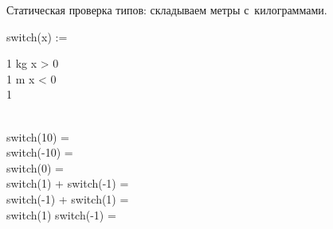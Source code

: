 


    Статическая проверка типов: складываем метры с~килограммами.

    \begin{preproc}

        switch(x) := \begin{caseblock}
                         1 \cdot kg \when x > 0 \\
                         1 \cdot m \when x < 0 \\
                         1 \otherwise
        \end{caseblock} \\

        switch(10) = \placeholder{} \\
        switch(-10) = \placeholder{} \\
        switch(0) = \placeholder{} \\
        switch(1) + switch(-1) = \placeholder{} \\
        switch(-1) + switch(1) = \placeholder{} \\
        switch(1) \cdot switch(-1) = \placeholder{} \\


    \end{preproc}




